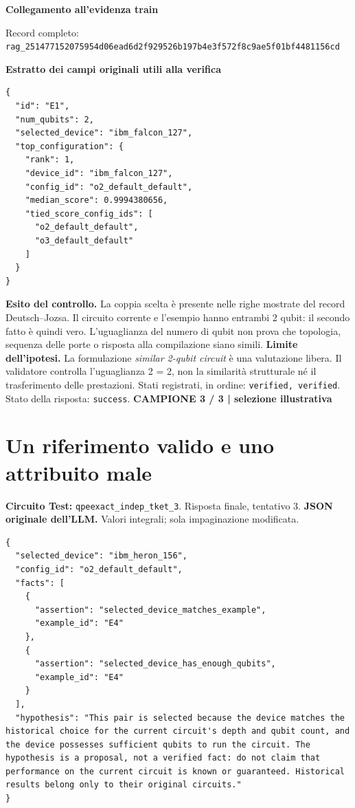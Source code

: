 \documentclass[a4paper,10pt]{article}
\newcommand{\tagline}[1]{{\small\color{ink}\textbf{#1}}\par}
\begin{document}
\textbf{Collegamento all'evidenza train}
\begin{center}\end{center}
{\footnotesize Record completo: \texttt{rag\_251477152075954d06ead6d2f929526b197b4e3f572f8c9ae5f01bf4481156cd}}\par
\textbf{Estratto dei campi originali utili alla verifica}
\begin{lstlisting}
{
  "id": "E1",
  "num_qubits": 2,
  "selected_device": "ibm_falcon_127",
  "top_configuration": {
    "rank": 1,
    "device_id": "ibm_falcon_127",
    "config_id": "o2_default_default",
    "median_score": 0.9994380656,
    "tied_score_config_ids": [
      "o2_default_default",
      "o3_default_default"
    ]
  }
}
\end{lstlisting}

\textbf{Esito del controllo.} La coppia scelta è presente nelle righe mostrate del record Deutsch--Jozsa. Il circuito corrente e l'esempio hanno entrambi 2 qubit: il secondo fatto è quindi vero. L'uguaglianza del numero di qubit non prova che topologia, sequenza delle porte o risposta alla compilazione siano simili.
{\color{warn}\textbf{Limite dell'ipotesi.}} La formulazione \emph{similar 2-qubit circuit} è una valutazione libera. Il validatore controlla l'uguaglianza 2 = 2, non la similarità strutturale né il trasferimento delle prestazioni.
{\small Stati registrati, in ordine: \texttt{verified, verified}. Stato della risposta: \texttt{success}.}
\newpage
\tagline{CAMPIONE 3 / 3 | selezione illustrativa}
\section*{Un riferimento valido e uno attribuito male}
\textbf{Circuito Test:} \texttt{qpeexact\_indep\_tket\_3}. Risposta finale, tentativo 3.
\textbf{JSON originale dell'LLM.} Valori integrali; sola impaginazione modificata.
\begin{lstlisting}
{
  "selected_device": "ibm_heron_156",
  "config_id": "o2_default_default",
  "facts": [
    {
      "assertion": "selected_device_matches_example",
      "example_id": "E4"
    },
    {
      "assertion": "selected_device_has_enough_qubits",
      "example_id": "E4"
    }
  ],
  "hypothesis": "This pair is selected because the device matches the historical choice for the current circuit's depth and qubit count, and the device possesses sufficient qubits to run the circuit. The hypothesis is a proposal, not a verified fact: do not claim that performance on the current circuit is known or guaranteed. Historical results belong only to their original circuits."
}
\end{lstlisting}
\end{document}
